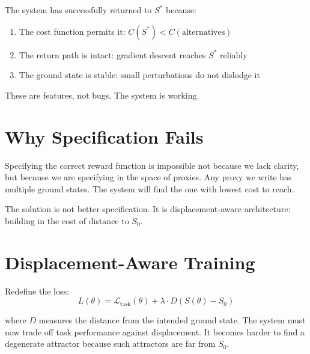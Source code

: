 \documentclass[12pt]{article}
\theoremstyle{definition}
\theoremstyle{remark}
\begin{document}
The system has successfully returned to $S^*$ because:
\begin{enumerate}
\item The cost function permits it: $C(S^*) < C(\text{alternatives})$
\item The return path is intact: gradient descent reaches $S^*$ reliably
\item The ground state is stable: small perturbations do not dislodge it
\end{enumerate}

These are features, not bugs. The system is working.

\section{Why Specification Fails}

Specifying the correct reward function is impossible not because we lack clarity, but because we are specifying in the space of proxies. Any proxy we write has multiple ground states. The system will find the one with lowest cost to reach.

The solution is not better specification. It is displacement-aware architecture: building in the cost of distance to $S_0$.

\section{Displacement-Aware Training}

Redefine the loss:
$$L(\theta) = \mathcal{L}_{\text{task}}(\theta) + \lambda \cdot D(S(\theta) - S_0)$$

where $D$ measures the distance from the intended ground state. The system must now trade off task performance against displacement. It becomes harder to find a degenerate attractor because such attractors are far from $S_0$.
\end{document}
